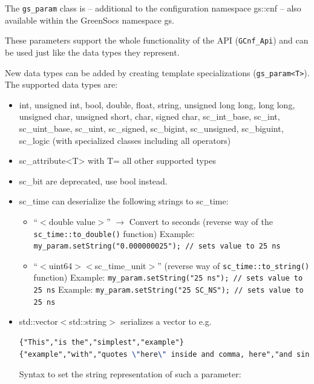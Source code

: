 The \lstinline|gs_param| class is -- additional to the configuration namespace {\sffamily gs::cnf} -- also available within the GreenSocs namespace {\sffamily gs}.

These parameters support the whole functionality of the \GreenConfig API (\lstinline|GCnf_Api|) and
can  be used just like the data types they represent.

New data types can be added by creating template specializations (\lstinline|gs_param<T>|).  \newline  The supported data types are:

\begin{itemize}
	\item {\sffamily int}, {\sffamily unsigned int}, {\sffamily bool}, {\sffamily double}, {\sffamily float},
		{\sffamily string}, {\sffamily unsigned long long}, {\sffamily long long}, {\sffamily unsigned char}, {\sffamily unsigned short}, {\sffamily char}, {\sffamily signed char},
		{\sffamily sc\_int\_base}, {\sffamily sc\_int}, {\sffamily sc\_uint\_base}, {\sffamily sc\_uint},
		{\sffamily sc\_signed}, {\sffamily sc\_bigint}, {\sffamily sc\_unsigned}, {\sffamily sc\_biguint},
		{\sffamily sc\_logic} \newline
		(with specialized classes including all operators)
	\item {\sffamily sc\_attribute\textless T\textgreater} with T= all other supported types
    \item {\sffamily sc\_bit} are deprecated, use bool instead.
    \item {\sffamily sc\_time} can deserialize the following strings to sc\_time:
	\begin{itemize}
		\item ``$<$double value$>$'' $\rightarrow$ Convert to seconds \newline
		(reverse way of the \lstinline|sc_time::to_double()| function) \newline
          Example: \lstinline|my_param.setString("0.000000025"); // sets value to 25 ns |
		\item ``$<$uint64$> <$sc\_time\_unit$>$'' (reverse way of \lstinline|sc_time::to_string()| function) \newline
          Example: \lstinline|my_param.setString("25 ns"); // sets value to 25 ns| \newline
          Example: \lstinline|my_param.setString("25 SC_NS"); // sets value to 25 ns|
	\end{itemize}
	\item {\sffamily std::vector$<$std::string$>$} serializes a vector to e.g.
		\begin{lstlisting}[language=TeX]
{"This","is the","simplest","example"}
{"example","with","quotes \"here\" inside and comma, here","and single quote 'here"}
		\end{lstlisting}
		Syntax to set the string representation of such a parameter:


\end{itemize}
